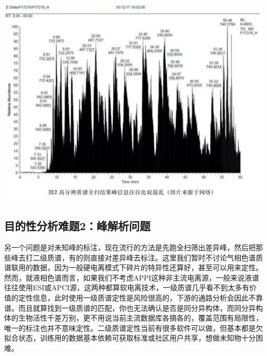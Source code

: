 \documentclass[
]{book}
\begin{document}
\includegraphics[width=6.67in]{images/expo2}

\hypertarget{ux76eeux7684ux6027ux5206ux6790ux96beux98982ux5cf0ux89e3ux6790ux95eeux9898}{%
\subsection{目的性分析难题2：峰解析问题}\label{ux76eeux7684ux6027ux5206ux6790ux96beux98982ux5cf0ux89e3ux6790ux95eeux9898}}

另一个问题是对未知峰的标注，现在流行的方法是先跑全扫筛出差异峰，然后把那些峰去打二级质谱，有的则直接对差异峰去标注。这里我们暂时不讨论气相色谱质谱联用的数据，因为一般硬电离模式下碎片的特异性还算好，甚至可以用来定性。然而，就液相色谱而言，如果我们不考虑APPI这种非主流电离源，一般来说液谱往往使用ESI或APCI源，这两种都算软电离技术，一级质谱几乎看不到太多有价值的定性信息，此时使用一级质谱定性是风险很高的，下游的通路分析会因此不靠谱。而且就算找到一级质谱的匹配，你也无法确认是否是同分异构体，而同分异构体的生物活性千差万别，更不用说当前主流数据库各搞各的，覆盖范围有局限性，唯一的标注也并不意味定性。二级质谱定性当前有很多软件可以做，但基本都是欠拟合状态，训练用的数据基本依赖可获取标准或社区用户共享，想做未知物十分困难。
\end{document}
